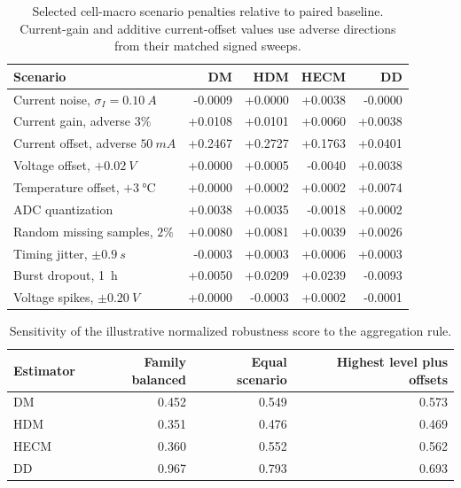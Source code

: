 \documentclass[review,nopreprintline]{elsarticle}
\begin{document}
\begin{table}[h]
\centering
\footnotesize
\caption{Selected cell-macro scenario penalties relative to paired baseline. Current-gain and additive current-offset values use adverse directions from their matched signed sweeps.}
\label{tab:appendix_key_results}
\begin{tabular}{lrrrr}
\toprule
Scenario & DM & HDM & HECM & DD \\
\midrule
Current noise, $\sigma_I=\SI{0.10}{A}$ & -0.0009 & +0.0000 & +0.0038 & -0.0000 \\
Current gain, adverse $3\%$ & +0.0108 & +0.0101 & +0.0060 & +0.0038 \\
Current offset, adverse $\SI{50}{mA}$ & +0.2467 & +0.2727 & +0.1763 & +0.0401 \\
Voltage offset, $+\SI{0.02}{V}$ & +0.0000 & +0.0005 & -0.0040 & +0.0038 \\
Temperature offset, $+\SI{3}{\celsius}$ & +0.0000 & +0.0002 & +0.0002 & +0.0074 \\
ADC quantization & +0.0038 & +0.0035 & -0.0018 & +0.0002 \\
Random missing samples, $2\%$ & +0.0080 & +0.0081 & +0.0039 & +0.0026 \\
Timing jitter, $\pm\SI{0.9}{s}$ & -0.0003 & +0.0003 & +0.0006 & +0.0003 \\
Burst dropout, \SI{1}{h} & +0.0050 & +0.0209 & +0.0239 & -0.0093 \\
Voltage spikes, $\pm\SI{0.20}{V}$ & +0.0000 & -0.0003 & +0.0002 & -0.0001 \\
\bottomrule
\end{tabular}
\end{table}

\begin{table}[h]
\centering
\footnotesize
\caption{Sensitivity of the illustrative normalized robustness score to the aggregation rule.}
\label{tab:appendix_robustness_sensitivity}
\begin{tabular}{lrrr}
\toprule
Estimator & Family balanced & Equal scenario & Highest level plus offsets \\
\midrule
DM   & 0.452 & 0.549 & 0.573 \\
HDM  & 0.351 & 0.476 & 0.469 \\
HECM & 0.360 & 0.552 & 0.562 \\
DD   & 0.967 & 0.793 & 0.693 \\
\bottomrule
\end{tabular}
\end{table}
\end{document}
